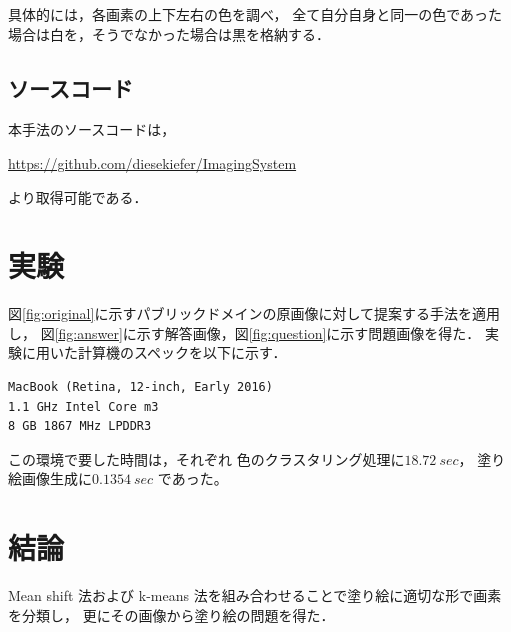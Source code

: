 \documentclass[dvipdfmx]{jsarticle}
\begin{document}
具体的には，各画素の上下左右の色を調べ，
全て自分自身と同一の色であった場合は白を，そうでなかった場合は黒を格納する．




\subsection{ソースコード}

本手法のソースコードは，

\noindent\url{https://github.com/diesekiefer/ImagingSystem}

\noindent より取得可能である．


\section{実験}
図\ref{fig:original}に示すパブリックドメインの原画像に対して提案する手法を適用し，
図\ref{fig:answer}に示す解答画像，図\ref{fig:question}に示す問題画像を得た．
実験に用いた計算機のスペックを以下に示す．
\begin{verbatim}
MacBook (Retina, 12-inch, Early 2016)
1.1 GHz Intel Core m3
8 GB 1867 MHz LPDDR3
\end{verbatim}
この環境で要した時間は，それぞれ
色のクラスタリング処理に$\SI{18.72}{sec}$，
塗り絵画像生成に$\SI{0.1354}{sec}$
であった。

\section{結論}
Mean shift 法および k-means 法を組み合わせることで塗り絵に適切な形で画素を分類し，
更にその画像から塗り絵の問題を得た．
\end{document}
